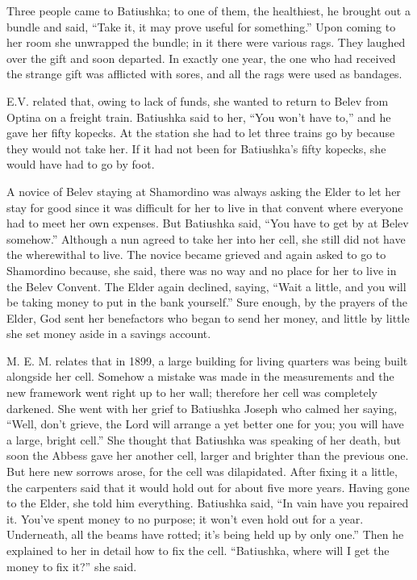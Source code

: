 Three people came to Batiushka; to one of them, the healthiest, he brought out a bundle and said, ``Take it, it may prove useful for something.'' Upon coming to her room she unwrapped the bundle; in it there were various rags. They laughed over the gift and soon departed. In exactly one year, the one who had received the strange gift was afflicted with sores, and all the rags were used as bandages.

E.V. related that, owing to lack of funds, she wanted to return to Belev from Optina on a freight train. Batiushka said to her, ``You won't have to,'' and he gave her fifty kopecks. At the station she had to let three trains go by because they would not take her. If it had not been for Batiushka's fifty kopecks, she would have had to go by foot.

A novice of Belev staying at Shamordino was always asking the Elder to let her stay for good since it was difficult for her to live in that convent where everyone had to meet her own expenses. But Batiushka said, ``You have to get by at Belev somehow.'' Although a nun agreed to take her into her cell, she still did not have the wherewithal to live. The novice became grieved and again asked to go to Shamordino because, she said, there was no way and no place for her to live in the Belev Convent. The Elder again declined, saying, ``Wait a little, and you will be taking money to put in the bank yourself.'' Sure enough, by the prayers of the Elder, God sent her benefactors who began to send her money, and little by little she set money aside in a savings account.

M. E. M. relates that in 1899, a large building for living quarters was being built alongside her cell. Somehow a mistake was made in the measurements and the new framework went right up to her wall; therefore her cell was completely darkened. She went with her grief to Batiushka Joseph who calmed her saying, ``Well, don't grieve, the Lord will arrange a yet better one for you; you will have a large, bright cell.'' She thought that Batiushka was speaking of her death, but soon the Abbess gave her another cell, larger and brighter than the previous one. But here new sorrows arose, for the cell was dilapidated. After fixing it a little, the carpenters said that it would hold out for about five more years. Having gone to the Elder, she told him everything. Batiushka said, ``In vain have you repaired it. You've spent money to no purpose; it won't even hold out for a year. Underneath, all the beams have rotted; it's being held up by only one.'' Then he explained to her in detail how to fix the cell. ``Batiushka, where will I get the money to fix it?'' she said.

